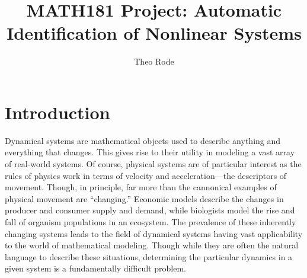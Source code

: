 \documentclass[10pt]{paper}
\begin{document}
\title{MATH181 Project: Automatic Identification of Nonlinear Systems}
\author{Theo Rode}



\maketitle

\section{Introduction} \label{sec:introduction}
Dynamical systems are mathematical objects used to describe anything and everything that changes. This gives rise to their utility in modeling a vast array of real-world systems. Of course, physical systems are of particular interest as the rules of physics work in terms of velocity and acceleration---the descriptors of movement. 
Though, in principle, far more than the cannonical examples of physical movement are ``changing.'' Economic models describe the changes in producer and consumer supply and demand, while biologists model the rise and fall of organism populations in an ecosystem. 
The prevalence of these inherently changing systems leads to the field of dynamical systems having vast applicability to the world of mathematical modeling. Though while they are often the natural language to describe these situations, determining the particular dynamics in a given system is a fundamentally difficult problem. 
\end{document}
